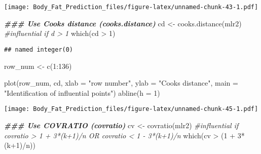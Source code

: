 \documentclass[
]{article}
\newenvironment{Shaded}{\begin{snugshade}}{\end{snugshade}}
\newcommand{\AttributeTok}[1]{\textcolor[rgb]{0.77,0.63,0.00}{#1}}
\newcommand{\CommentTok}[1]{\textcolor[rgb]{0.56,0.35,0.01}{\textit{#1}}}
\newcommand{\DecValTok}[1]{\textcolor[rgb]{0.00,0.00,0.81}{#1}}
\newcommand{\DocumentationTok}[1]{\textcolor[rgb]{0.56,0.35,0.01}{\textbf{\textit{#1}}}}
\newcommand{\FunctionTok}[1]{\textcolor[rgb]{0.00,0.00,0.00}{#1}}
\newcommand{\NormalTok}[1]{#1}
\newcommand{\OtherTok}[1]{\textcolor[rgb]{0.56,0.35,0.01}{#1}}
\newcommand{\SpecialCharTok}[1]{\textcolor[rgb]{0.00,0.00,0.00}{#1}}
\newcommand{\StringTok}[1]{\textcolor[rgb]{0.31,0.60,0.02}{#1}}
\begin{document}
\texttt{[image: Body\_Fat\_Prediction\_files/figure-latex/unnamed-chunk-43-1.pdf]}

\begin{Shaded}
\begin{Highlighting}[]
\DocumentationTok{\#\#\# Use Cook\textquotesingle{}s distance (cooks.distance)}
\NormalTok{cd }\OtherTok{\textless{}{-}} \FunctionTok{cooks.distance}\NormalTok{(mlr2) }\CommentTok{\#influential if d \textgreater{} 1}
\FunctionTok{which}\NormalTok{(cd }\SpecialCharTok{\textgreater{}} \DecValTok{1}\NormalTok{)}
\end{Highlighting}
\end{Shaded}

\begin{verbatim}
## named integer(0)
\end{verbatim}

\begin{Shaded}
\begin{Highlighting}[]
\NormalTok{row\_num }\OtherTok{\textless{}{-}} \FunctionTok{c}\NormalTok{(}\DecValTok{1}\SpecialCharTok{:}\DecValTok{136}\NormalTok{)}
\end{Highlighting}
\end{Shaded}

\begin{Shaded}
\begin{Highlighting}[]
\FunctionTok{plot}\NormalTok{(row\_num, cd, }\AttributeTok{xlab =} \StringTok{"row number"}\NormalTok{,}
     \AttributeTok{ylab =} \StringTok{"Cook\textquotesingle{}s distance"}\NormalTok{, }
     \AttributeTok{main =} \StringTok{"Identification of influential points"}\NormalTok{)}
\FunctionTok{abline}\NormalTok{(}\AttributeTok{h =} \DecValTok{1}\NormalTok{)}
\end{Highlighting}
\end{Shaded}

\texttt{[image: Body\_Fat\_Prediction\_files/figure-latex/unnamed-chunk-45-1.pdf]}

\begin{Shaded}
\begin{Highlighting}[]
\DocumentationTok{\#\#\# Use COVRATIO (covratio)}
\NormalTok{cv }\OtherTok{\textless{}{-}} \FunctionTok{covratio}\NormalTok{(mlr2) }\CommentTok{\#influential if covratio \textgreater{} 1 + 3*(k+1)/n OR covratio \textless{} 1 {-} 3*(k+1)/n}
\FunctionTok{which}\NormalTok{(cv }\SpecialCharTok{\textgreater{}}\NormalTok{ (}\DecValTok{1} \SpecialCharTok{+} \DecValTok{3}\SpecialCharTok{*}\NormalTok{(k}\SpecialCharTok{+}\DecValTok{1}\NormalTok{)}\SpecialCharTok{/}\NormalTok{n))}
\end{Highlighting}
\end{Shaded}
\end{document}
